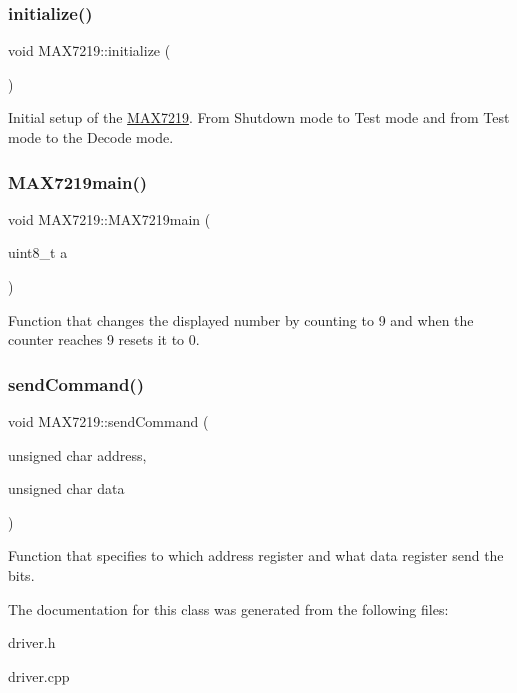 \subsubsection{\texorpdfstring{initialize()}{initialize()}}
{\footnotesize\ttfamily void M\+A\+X7219\+::initialize (\begin{DoxyParamCaption}{ }\end{DoxyParamCaption})}

Initial setup of the \mbox{\hyperlink{class_m_a_x7219}{M\+A\+X7219}}. From Shutdown mode to Test mode and from Test mode to the Decode mode. \mbox{\label{class_m_a_x7219_a08d465502f884573bed22af5add2dcb0}} 
\subsubsection{\texorpdfstring{MAX7219main()}{MAX7219main()}}
{\footnotesize\ttfamily void M\+A\+X7219\+::\+M\+A\+X7219main (\begin{DoxyParamCaption}\item[{uint8\+\_\+t}]{a }\end{DoxyParamCaption})}

Function that changes the displayed number by counting to 9 and when the counter reaches 9 resets it to 0. \mbox{\label{class_m_a_x7219_a9006fd3f33c2354edbb856f564b4d9e7}} 
\subsubsection{\texorpdfstring{sendCommand()}{sendCommand()}}
{\footnotesize\ttfamily void M\+A\+X7219\+::send\+Command (\begin{DoxyParamCaption}\item[{unsigned char}]{address,  }\item[{unsigned char}]{data }\end{DoxyParamCaption})}

Function that specifies to which address register and what data register send the bits. 

The documentation for this class was generated from the following files\+:\begin{DoxyCompactItemize}
\item 
driver.\+h\item 
driver.\+cpp\end{DoxyCompactItemize}
